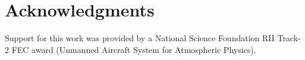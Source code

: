 \documentclass{sig-alternate}
\begin{document}
\section{Acknowledgments}
Support for this work was provided by a National Science Foundation
RII Track-2 FEC award (Unmanned Aircraft System for Atmospheric
Physics).



%

\end{document}
